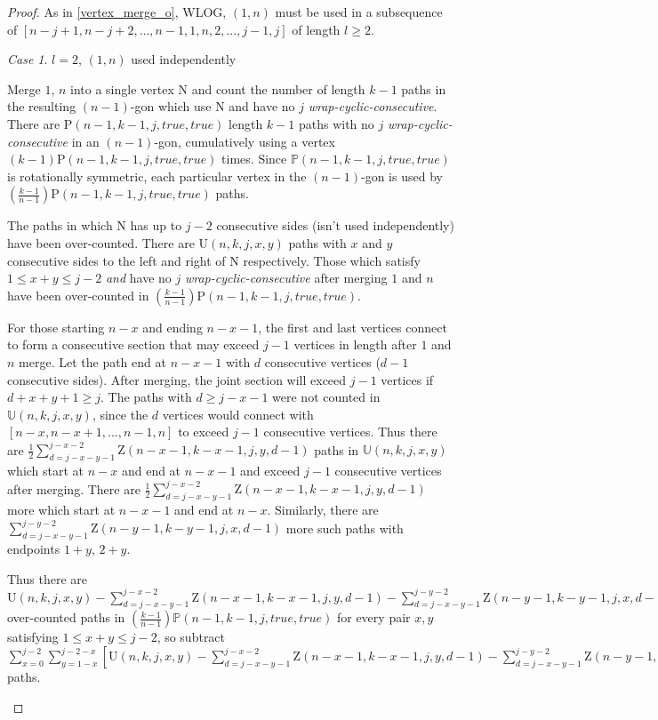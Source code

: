 \documentclass[a4paper, 12pt] {article}
\theoremstyle{remark}
\theoremstyle{plain}
\theoremstyle{remark}
\newtheorem{case}{Case}
\begin{document}
\begin{proof}
As in \ref{vertex_merge_o}, WLOG, $(1,n)$ must be used in a subsequence of $[n-j+1,n-j+2,...,n-1,1,n,2,...,j-1,j]$ of length $l \geq 2$.

\begin{case} $l=2$, $(1,n)$ used independently
\label{vertex_merge_u_leq2}

Merge $1$, $n$ into a single vertex $\mathrm{N}$ and count the number of length $k-1$ paths in the resulting $(n-1)$-gon which use $\mathrm{N}$ and have no $j$ \textit{wrap-cyclic-consecutive}. There are $\mathrm{P}(n-1,k-1,j,true,true)$ length $k-1$ paths with no $j$ \textit{wrap-cyclic-consecutive} in an $(n-1)$-gon, cumulatively using a vertex $(k-1)\mathrm{P}(n-1,k-1,j,true,true)$ times. Since $\mathbb{P}(n-1,k-1,j,true,true)$ is rotationally symmetric, each particular vertex in the $(n-1)$-gon is used by $\left(\frac{k-1}{n-1}\right)\mathrm{P}(n-1,k-1,j,true,true)$ paths.

The paths in which $\mathrm{N}$ has up to $j-2$ consecutive sides (isn't used independently) have been over-counted. There are $\mathrm{U}(n,k,j,x,y)$ paths with $x$ and $y$ consecutive sides to the left and right of $\mathrm{N}$ respectively. Those which satisfy $1 \leq x+y \leq j-2$ \emph{and} have no $j$ \textit{wrap-cyclic-consecutive} after merging $1$ and $n$ have been over-counted in $\left(\frac{k-1}{n-1}\right)\mathrm{P}(n-1,k-1,j,true,true)$.

For those starting $n-x$ and ending $n-x-1$, the first and last vertices connect to form a consecutive section that may exceed $j-1$ vertices in length after $1$ and $n$ merge. Let the path end at $n-x-1$ with $d$ consecutive vertices ($d-1$ consecutive sides). After merging, the joint section will exceed $j-1$ vertices if $d+x+y+1 \geq j$. The paths with $d \geq j-x-1$ were not counted in $\mathbb{U}(n,k,j,x,y)$, since the $d$ vertices would connect with $[n-x,n-x+1,...,n-1,n]$ to exceed $j-1$ consecutive vertices. Thus there are $\frac{1}{2}\sum_{d=j-x-y-1}^{j-x-2} \mathrm{Z}(n-x-1,k-x-1,j,y,d-1)$ paths in $\mathbb{U}(n,k,j,x,y)$ which start at $n-x$ and end at $n-x-1$ and exceed $j-1$ consecutive vertices after merging. There are $\frac{1}{2}\sum_{d=j-x-y-1}^{j-x-2} \mathrm{Z}(n-x-1,k-x-1,j,y,d-1)$ more which start at $n-x-1$ and end at $n-x$. Similarly, there are $\sum_{d=j-x-y-1}^{j-y-2} \mathrm{Z}(n-y-1,k-y-1,j,x,d-1)$ more such paths with endpoints $1+y$, $2+y$.

Thus there are $\mathrm{U}(n,k,j,x,y)-\sum_{d=j-x-y-1}^{j-x-2} \mathrm{Z}(n-x-1,k-x-1,j,y,d-1)-\sum_{d=j-x-y-1}^{j-y-2} \mathrm{Z}(n-y-1,k-y-1,j,x,d-1)$ over-counted paths in $\left(\frac{k-1}{n-1}\right)\mathbb{P}(n-1,k-1,j,true,true)$ for every pair $x,y$ satisfying $1 \leq x+y \leq j-2$, so subtract $\sum_{x=0}^{j-2} \sum_{y=1-x}^{j-2-x} [\mathrm{U}(n,k,j,x,y)-\sum_{d=j-x-y-1}^{j-x-2} \mathrm{Z}(n-x-1,k-x-1,j,y,d-1)-\sum_{d=j-x-y-1}^{j-y-2} \mathrm{Z}(n-y-1,k-y-1,j,x,d-1)]$ paths.


\end{case}
\end{proof}
\end{document}
